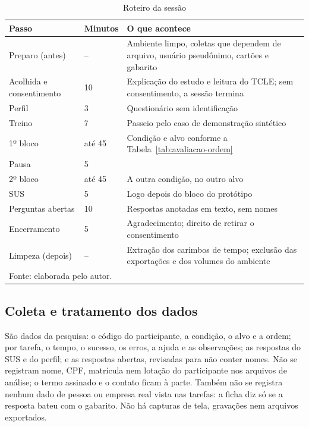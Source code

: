 \begin{table}[htbp]
\centering
\caption{Roteiro da sessão}
\label{tab:avaliacao-sessao}
\small
\begin{tabular}{p{4.2cm}p{1.6cm}p{8.4cm}}
\hline
\textbf{Passo} & \textbf{Minutos} & \textbf{O que acontece} \\ \hline
Preparo (antes) & -- & Ambiente limpo, coletas que dependem de arquivo, usuário pseudônimo, cartões e gabarito \\
Acolhida e consentimento & 10 & Explicação do estudo e leitura do TCLE; sem consentimento, a sessão termina \\
Perfil & 3 & Questionário sem identificação \\
Treino & 7 & Passeio pelo caso de demonstração sintético \\
1º bloco & até 45 & Condição e alvo conforme a Tabela~\ref{tab:avaliacao-ordem} \\
Pausa & 5 & \\
2º bloco & até 45 & A outra condição, no outro alvo \\
SUS & 5 & Logo depois do bloco do protótipo \\
Perguntas abertas & 10 & Respostas anotadas em texto, sem nomes \\
Encerramento & 5 & Agradecimento; direito de retirar o consentimento \\
Limpeza (depois) & -- & Extração dos carimbos de tempo; exclusão das exportações e dos volumes do ambiente \\ \hline
\multicolumn{3}{l}{\footnotesize Fonte: elaborada pelo autor.}\\
\end{tabular}
\end{table}

\subsection{Coleta e tratamento dos dados}
\label{sec:avaliacao-dados}

São dados da pesquisa: o código do participante, a condição, o alvo e a
ordem; por tarefa, o tempo, o sucesso, os erros, a ajuda e as observações;
as respostas do SUS e do perfil; e as respostas abertas, revisadas para não
conter nomes. Não se registram nome, CPF, matrícula nem lotação do
participante nos arquivos de análise; o termo assinado e o contato ficam à
parte. Também não se registra nenhum dado de pessoa ou empresa real vista
nas tarefas: a ficha diz só se a resposta bateu com o gabarito. Não há
capturas de tela, gravações nem arquivos exportados.


